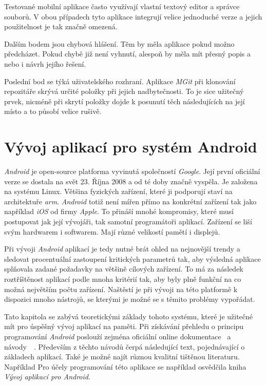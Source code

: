     Testované mobilní aplikace často využívají vlastní textový editor a správce souborů. V obou případech tyto aplikace integrují velice jednoduché verze a jejich použitelnost je tak značně omezená.

    Dalším bodem jsou chybová hlášení. Těm by měla aplikace pokud možno předcházet. Pokud chybě již není vyhnutí, alespoň by měla mít přesný popis a nebo i návrh jejího řešení.

    Poslední bod se týká uživatelského rozhraní. Aplikace \emph{MGit} při klonování repozitáře skrývá určité položky při jejich nadbytečnosti. To je sice užitečný prvek, nicméně při skrytí položky dojde k posunutí těch následujících na její místo a to působí velice rušivě.

\chapter{Vývoj aplikací pro systém Android}
\emph{Android} je open-source platforma vyvinutá společností \emph{Google}. Její první oficiální verze se dostala na svět 23. Října 2008 a od té doby značně vyspěla. Je založena na systému Linux. Většina fyzických zařízení, které ji podporují staví na architektuře \emph{arm}. \emph{Android} totiž není mířen přímo na konkrétní zařízení tak jako například \emph{iOS} od firmy \emph{Apple}. To přináší mnohé kompromisy, které musí postupovat jak její vývojáři, tak samotní programátoři aplikací. Zařízení se liší svým hardwarem i softwarem. Mají různé velikostí pamětí i displejů.

Při vývoji \emph{Android} aplikací je tedy nutné brát ohled na nejnovější trendy a sledovat procentuální zastoupení kritických parametrů tak, aby výsledná aplikace splňovala zadané požadavky na většině cílových zařízení. To má za následek roztříštěnost aplikací podle mnoha kritérií tak, aby byly plně funkční na co možná největším počtu zařízení. Naštěstí je při vývoji na této platformě k dispozici mnoho nástrojů, se kterými je možné se s těmito problémy vypořádat.

Tato kapitola se zabývá teoretickými základy tohoto systému, které je užitečné mít pro úspěšný vývoj aplikací na paměti. Při získávání přehledu o principu programování \emph{Android} poslouží zejména oficiální online dokumentace~ a návody~~. Především z těchto návodů čerpá následující text, pojednávající o základech aplikací. Také je možné najít různou kvalitní tištěnou literaturu. Například Pro účely programování této aplikace se například osvědčila kniha \emph{Vývoj aplikací pro Android}\cite{android-Lacko}.

